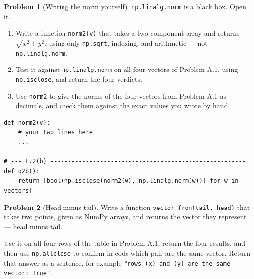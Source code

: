 \documentclass[11pt]{article}
\theoremstyle{definition}
\newtheorem{prob}{Problem}[section]
\begin{document}
\begin{prob}[Writing the norm yourself]
\texttt{np.linalg.norm} is a black box. Open it.

\begin{enumerate}[label=\textbf{(\alph*)},leftmargin=2.6em,itemsep=7pt,topsep=6pt]
  \item Write a function \texttt{norm2(v)} that takes a two-component array and
        returns $\sqrt{x^{2}+y^{2}}$, using only \texttt{np.sqrt}, indexing, and
        arithmetic --- not \texttt{np.linalg.norm}.
  \item Test it against \texttt{np.linalg.norm} on all four vectors of
        Problem A.1, using \texttt{np.isclose}, and return the four verdicts.
  \item Use \texttt{norm2} to give the norms of the four vectors from
        Problem A.1 as decimals, and check them against the exact values you
        wrote by hand.
\end{enumerate}

\begin{lstlisting}
def norm2(v):
    # your two lines here
    ...

# --- F.2(b) -------------------------------------------------------
def q2b():
    return [bool(np.isclose(norm2(w), np.linalg.norm(w))) for w in vectors]
\end{lstlisting}
\end{prob}

\begin{prob}[Head minus tail]
Write a function \texttt{vector\_from(tail, head)} that takes two points, given
as NumPy arrays, and returns the vector they represent --- head minus tail.

Use it on all four rows of the table in Problem A.1, return the four results, and
then use \texttt{np.allclose} to confirm in code which pair are the same vector.
Return that answer as a sentence, for example \texttt{"rows (x) and (y) are the
same vector: True"}.
\end{prob}
\end{document}

